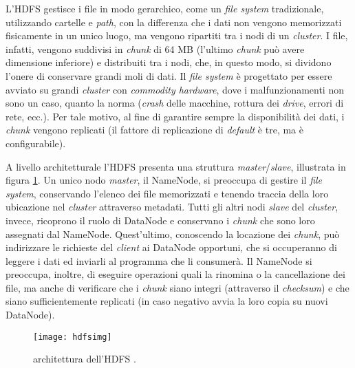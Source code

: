 L’HDFS gestisce i file in modo gerarchico, come un \textit{file system} tradizionale, utilizzando cartelle e \textit{path}, con la differenza che i dati non vengono memorizzati fisicamente in un unico
 luogo, ma vengono ripartiti tra i nodi di un \textit{cluster}. I file, infatti, vengono suddivisi in \textit{chunk} di 64 MB (l’ultimo \textit{chunk} può avere dimensione inferiore) e distribuiti tra i nodi, 
 che, in questo modo, si dividono l’onere di conservare grandi moli di dati. Il \textit{file system} è progettato per essere avviato su grandi \textit{cluster} con \textit{commodity hardware}, dove i
 malfunzionamenti non sono un caso, quanto la norma (\textit{crash} delle macchine, rottura dei \textit{drive}, errori di rete, ecc.). Per tale motivo, al fine di garantire sempre la disponibilità 
 dei dati, i \textit{chunk} vengono replicati (il fattore di replicazione di \textit{default} è tre, ma è configurabile).

A livello architetturale l’HDFS presenta una struttura \textit{master}/\textit{slave}, illustrata in figura \ref{hdfsimage}. Un unico nodo \textit{master}, il NameNode, si preoccupa di gestire il \textit{file system}, conservando 
l’elenco dei file memorizzati e tenendo traccia della loro ubicazione nel \textit{cluster} attraverso metadati. Tutti gli altri nodi \textit{slave} del \textit{cluster}, invece, ricoprono il ruolo di DataNode 
e conservano i \textit{chunk} che sono loro assegnati dal NameNode. Quest’ultimo, conoscendo la locazione dei \textit{chunk}, può indirizzare le richieste del \textit{client} ai DataNode opportuni, che si 
occuperanno di leggere i dati ed inviarli al programma che li consumerà. Il NameNode si preoccupa, inoltre, di eseguire operazioni quali la rinomina o la cancellazione dei file, 
ma anche di verificare che i \textit{chunk} siano integri (attraverso il \textit{checksum}) e che siano sufficientemente replicati (in caso negativo avvia la loro copia su nuovi DataNode).

\begin{figure}[ht]
\centering
\texttt{[image: hdfsimg]}
\caption{architettura dell'HDFS \cite{hadoop}.}
\label{hdfsimage}
\end{figure}

